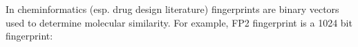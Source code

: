 
In cheminformatics (esp. drug design literature) fingerprints are binary vectors used to determine molecular similarity. For example, FP2 fingerprint is a  1024 bit fingerprint:
\begin{center}
\end{center}



